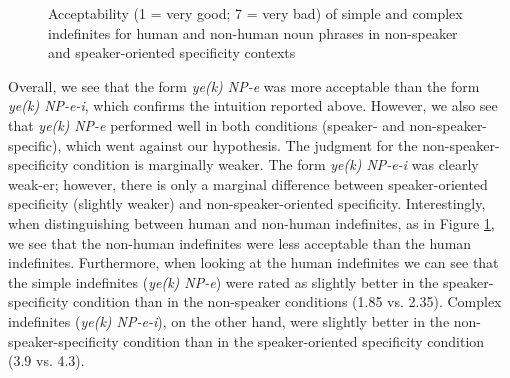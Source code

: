 \documentclass[output=paper]{langsci/langscibook}
\begin{document}
\begin{figure}


\dataset
{}
\caption{Acceptability (1 = very good; 7 = very bad) of simple and complex indefinites for human and non-human noun phrases in non-speaker and speaker-oriented specificity contexts}\label{4fig:2}
\end{figure}


{
\largerpage
Overall, we see that the form {\emph{ye(k) NP-e}} was more acceptable than the form {\emph{ye(k) NP-e-i}}, which confirms the intuition reported above. However, we also see that {\emph{ye(k)}} \mbox{\emph{NP-e}} performed well in both conditions (speaker- and non-speaker-specific), which went against our hypothesis. The judgment for the non-speaker-specificity condition is marginally weaker. The form {\emph{ye(k) NP-e-i}} was clearly weak-er; however, there is only a marginal difference between speaker-oriented specificity (slightly weaker) and non-speaker-oriented specificity. Interestingly, when distinguishing between human and non-human indefinites, as in Figure \ref{4fig:2}, we see that the non-human indefinites were less acceptable than the human indefinites. Furthermore, when looking at the human indefinites we can see that the simple indefinites ({\emph{ye(k) NP-e}}) were rated as slightly better in the speaker-specificity condition than in the non-speaker conditions (1.85 vs. 2.35). Complex indefinites ({\emph{ye(k) NP-e-i}}), on the other hand, were slightly better in the non-speaker-specificity condition than in the speaker-oriented specificity condition (3.9 vs. 4.3).
}
\end{document}
